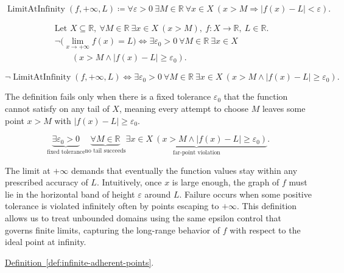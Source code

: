 \begin{remark*}
\[
\operatorname{LimitAtInfinity}(f,+\infty,L) \coloneqq \forall \varepsilon > 0\ \exists M \in \mathbb{R}\ \forall x \in X\ (x > M \Rightarrow |f(x) - L| < \varepsilon).
\]
\end{remark*}

\begin{remark*}
\[
\begin{aligned}
&\text{Let } X \subseteq \mathbb{R},\ \forall M \in \mathbb{R}\ \exists x \in X\ (x > M),\ f : X \to \mathbb{R},\ L \in \mathbb{R}.\\
&\neg\bigl(\lim_{x \to +\infty} f(x) = L\bigr) \Longleftrightarrow \exists \varepsilon_0 > 0\ \forall M \in \mathbb{R}\ \exists x \in X\\
&\qquad (x > M \land |f(x) - L| \ge \varepsilon_0).
\end{aligned}
\]
\end{remark*}

\begin{remark*}
\[
\neg\operatorname{LimitAtInfinity}(f,+\infty,L) \Longleftrightarrow \exists \varepsilon_0 > 0\ \forall M \in \mathbb{R}\ \exists x \in X\ (x > M \land |f(x) - L| \ge \varepsilon_0).
\]
\end{remark*}

\begin{remark*}
The definition fails only when there is a fixed tolerance $\varepsilon_0$ that the function cannot satisfy on any tail of $X$, meaning every attempt to choose $M$ leaves some point $x > M$ with $|f(x) - L| \ge \varepsilon_0$.
\end{remark*}

\begin{remark*}
\[
\underbrace{\exists \varepsilon_0 > 0}_{\text{fixed tolerance}}
\underbrace{\forall M \in \mathbb{R}}_{\text{no tail succeeds}}
\underbrace{\exists x \in X\ (x > M \land |f(x) - L| \ge \varepsilon_0)}_{\text{far-point violation}}.
\]
\end{remark*}

\begin{remark*}[Interpretation]
The limit at $+\infty$ demands that eventually the function values stay within any prescribed accuracy of $L$. Intuitively, once $x$ is large enough, the graph of $f$ must lie in the horizontal band of height $\varepsilon$ around $L$. Failure occurs when some positive tolerance is violated infinitely often by points escaping to $+\infty$. This definition allows us to treat unbounded domains using the same epsilon control that governs finite limits, capturing the long-range behavior of $f$ with respect to the ideal point at infinity.
\end{remark*}

\begin{remark*}[Dependencies]
\hyperref[def:infinite-adherent-points]{Definition~\ref*{def:infinite-adherent-points}}.
\end{remark*}
